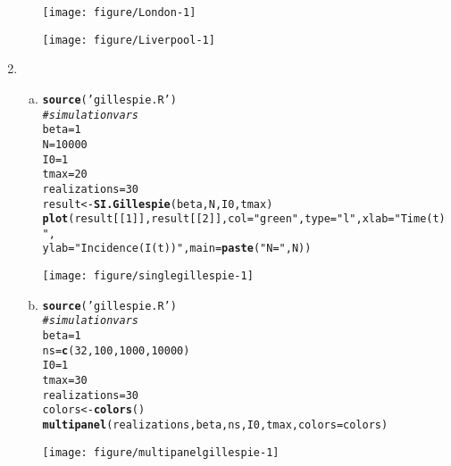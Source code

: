 \documentclass[12pt]{article}\usepackage[]{graphicx}\usepackage[]{color}
\makeatletter
\def\maxwidth{ %
  \ifdim\Gin@nat@width>\linewidth
    \linewidth
  \else
    \Gin@nat@width
  \fi
}
\newcommand{\hlnum}[1]{\textcolor[rgb]{0.686,0.059,0.569}{#1}}%
\newcommand{\hlstr}[1]{\textcolor[rgb]{0.192,0.494,0.8}{#1}}%
\newcommand{\hlcom}[1]{\textcolor[rgb]{0.678,0.584,0.686}{\textit{#1}}}%
\newcommand{\hlstd}[1]{\textcolor[rgb]{0.345,0.345,0.345}{#1}}%
\newcommand{\hlkwb}[1]{\textcolor[rgb]{0.69,0.353,0.396}{#1}}%
\newcommand{\hlkwc}[1]{\textcolor[rgb]{0.333,0.667,0.333}{#1}}%
\newcommand{\hlkwd}[1]{\textcolor[rgb]{0.737,0.353,0.396}{\textbf{#1}}}%
\newenvironment{kframe}{%
 \def\at@end@of@kframe{}%
 \ifinner\ifhmode%
  \def\at@end@of@kframe{\end{minipage}}%
  \begin{minipage}{\columnwidth}%
 \fi\fi%
 \def\FrameCommand##1{\hskip\@totalleftmargin \hskip-\fboxsep
 \colorbox{shadecolor}{##1}\hskip-\fboxsep
     \hskip-\linewidth \hskip-\@totalleftmargin \hskip\columnwidth}%
 \MakeFramed {\advance\hsize-\width
   \@totalleftmargin\z@ \linewidth\hsize
   \@setminipage}}%
 {\par\unskip\endMakeFramed%
 \at@end@of@kframe}
\newenvironment{knitrout}{}{} %
\makeatother
\begin{document}
\begin{enumerate}
\begin{enumerate}[(a)]
\begin{knitrout}
\color{fgcolor}
\texttt{[image: figure/London-1]} 

\end{knitrout}
\begin{knitrout}
\color{fgcolor}
\texttt{[image: figure/Liverpool-1]} 

\end{knitrout}
    \end{enumerate}
    \item \SEintro
    \begin{enumerate}[(a)]
        \item

\begin{knitrout}
\color{fgcolor}\begin{kframe}
\begin{alltt}
\hlkwd{source}\hlstd{(}\hlstr{'gillespie.R'}\hlstd{)}
\hlcom{#simulation vars}
\hlstd{beta} \hlkwb{=} \hlnum{1}
\hlstd{N} \hlkwb{=} \hlnum{10000}
\hlstd{I0} \hlkwb{=} \hlnum{1}
\hlstd{tmax} \hlkwb{=} \hlnum{20}
\hlstd{realizations} \hlkwb{=} \hlnum{30}
\hlstd{result} \hlkwb{<-} \hlkwd{SI.Gillespie}\hlstd{(beta,N,I0,tmax)}
\hlkwd{plot}\hlstd{(result[[}\hlnum{1}\hlstd{]], result[[}\hlnum{2}\hlstd{]],} \hlkwc{col}\hlstd{=}\hlstr{"green"}\hlstd{,} \hlkwc{type}\hlstd{=}\hlstr{"l"}\hlstd{,} \hlkwc{xlab}\hlstd{=}\hlstr{"Time (t)"}\hlstd{,}
     \hlkwc{ylab}\hlstd{=}\hlstr{"Incidence (I(t))"}\hlstd{,} \hlkwc{main}\hlstd{=}\hlkwd{paste}\hlstd{(}\hlstr{"N ="}\hlstd{,N))}
\end{alltt}
\end{kframe}
\texttt{[image: figure/singlegillespie-1]} 

\end{knitrout}
        \item

\begin{knitrout}
\color{fgcolor}\begin{kframe}
\begin{alltt}
\hlkwd{source}\hlstd{(}\hlstr{'gillespie.R'}\hlstd{)}
\hlcom{#simulation vars}
\hlstd{beta} \hlkwb{=} \hlnum{1}
\hlstd{ns} \hlkwb{=} \hlkwd{c}\hlstd{(}\hlnum{32}\hlstd{,}\hlnum{100}\hlstd{,}\hlnum{1000}\hlstd{,}\hlnum{10000}\hlstd{)}
\hlstd{I0} \hlkwb{=} \hlnum{1}
\hlstd{tmax} \hlkwb{=} \hlnum{30}
\hlstd{realizations} \hlkwb{=} \hlnum{30}
\hlstd{colors} \hlkwb{<-} \hlkwd{colors}\hlstd{()}
\hlkwd{multipanel}\hlstd{(realizations,beta,ns,I0,tmax,}\hlkwc{colors}\hlstd{=colors)}
\end{alltt}
\end{kframe}
\texttt{[image: figure/multipanelgillespie-1]} 


\end{knitrout}
\end{enumerate}
\end{enumerate}
\end{document}
